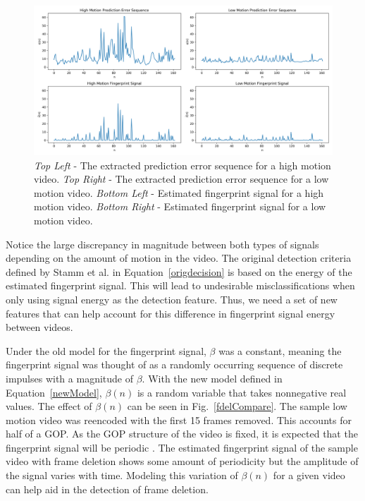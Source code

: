 \begin{figure}[htbp]
\centerline{\includegraphics[width=0.9\linewidth]{ProposedApproach/perror_seq_comparisons.png}}
\caption{\emph{Top Left} - The extracted prediction error sequence for a high motion video. \emph{Top Right} - The extracted prediction error sequence for a low motion video. \emph{Bottom Left} - Estimated fingerprint signal for a high motion video. \emph{Bottom Right} - Estimated fingerprint signal for a low motion video.}
\label{seqCompare}
\end{figure}

Notice the large discrepancy in magnitude between both types of signals depending on the amount of motion in the video. The original detection criteria defined by Stamm et al. in Equation~\ref{origdecision} is based on the energy of the estimated fingerprint signal. This will lead to undesirable misclassifications when only using signal energy as the detection feature. Thus, we need a set of new features that can help account for this difference in fingerprint signal energy between videos. 

Under the old model for the fingerprint signal, $\beta$ was a constant, meaning the fingerprint signal was thought of as a randomly occurring sequence of discrete impulses with a magnitude of $\beta$. With the new model defined in Equation~\ref{newModel}, $\beta(n)$ is a random variable that takes nonnegative real values. The effect of $\beta(n)$ can be seen in Fig.~\ref{fdelCompare}. The sample low motion video was reencoded with the first 15 frames removed. This accounts for half of a GOP. As the GOP structure of the video is fixed, it is expected that the fingerprint signal will be periodic \cite{stamm}. The estimated fingerprint signal of the sample video with frame deletion shows some amount of periodicity but the amplitude of the signal varies with time. Modeling this variation of $\beta(n)$ for a given video can help aid in the detection of frame deletion.

